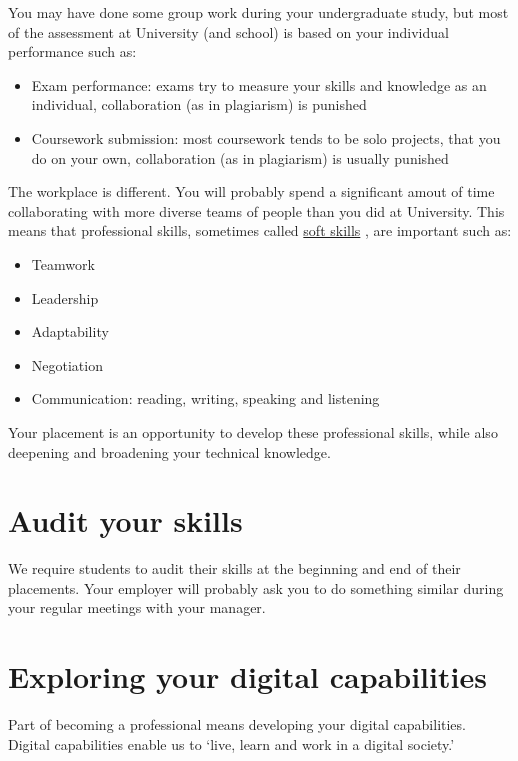 \documentclass[
]{book}
\providecommand{\tightlist}{%
  \setlength{\itemsep}{0pt}\setlength{\parskip}{0pt}}
\begin{document}
You may have done some group work during your undergraduate study, but most of the assessment at University (and school) is based on your individual performance such as:

\begin{itemize}
\tightlist
\item
  Exam performance: exams try to measure your skills and knowledge as an individual, collaboration (as in plagiarism) is punished
\item
  Coursework submission: most coursework tends to be solo projects, that you do on your own, collaboration (as in plagiarism) is usually punished
\end{itemize}

The workplace is different. You will probably spend a significant amout of time collaborating with more diverse teams of people than you did at University. This means that professional skills, sometimes called \href{https://en.wikipedia.org/wiki/Soft_skills}{soft skills} \citep{soft, transferable, professionalism}, are important such as:

\begin{itemize}
\tightlist
\item
  Teamwork
\item
  Leadership
\item
  Adaptability
\item
  Negotiation
\item
  Communication: reading, writing, speaking and listening
\end{itemize}

Your placement is an opportunity to develop these professional skills, while also deepening and broadening your technical knowledge.

\section{Audit your skills}\label{Audit}

We require students to audit their skills at the beginning and end of their placements. Your employer will probably ask you to do something similar during your regular meetings with your manager.

\section{Exploring your digital capabilities}\label{digital}

Part of becoming a professional means developing your digital capabilities. Digital capabilities enable us to `live, learn and work in a digital society.'
\end{document}

